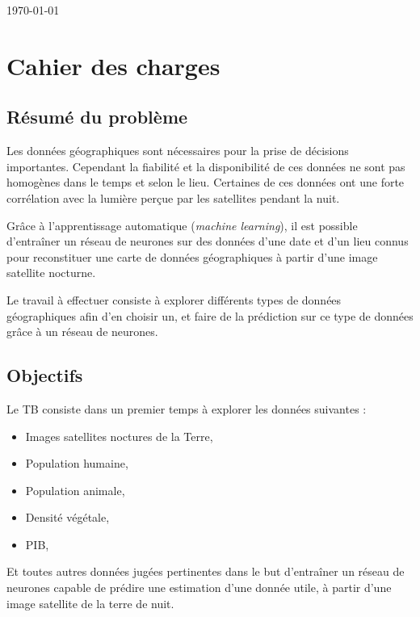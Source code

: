 \documentclass[a4paper, 11pt]{report}
\begin{document}
\begin{titlepage}
{\large \today}\\
 

\vfill %

\end{titlepage}

\tableofcontents

\chapter{Cahier des charges}

\section{Résumé du problème}
Les données géographiques sont nécessaires pour la prise de décisions importantes. Cependant la fiabilité et la disponibilité de ces données ne sont pas homogènes dans le temps et selon le lieu. Certaines de ces données ont une forte corrélation avec la lumière perçue par les satellites pendant la nuit.

Grâce à l'apprentissage automatique (\textit{machine learning}), il est possible d'entraîner un réseau de neurones sur des données d'une date et d'un lieu connus pour reconstituer une carte de données géographiques à partir d'une image satellite nocturne.

Le travail à effectuer consiste à explorer différents types de données géographiques afin d'en choisir un, et faire de la prédiction sur ce type de données grâce à un réseau de neurones.

\section{Objectifs}
Le TB consiste dans un premier temps à explorer les données suivantes :

\begin{itemize}
\item Images satellites noctures de la Terre,
\item Population humaine,
\item Population animale,
\item Densité végétale,
\item PIB,
\end{itemize}

Et toutes autres données jugées pertinentes dans le but d'entraîner un réseau de neurones capable de prédire une estimation d'une donnée utile, à partir d'une image satellite de la terre de nuit.
\end{document}
